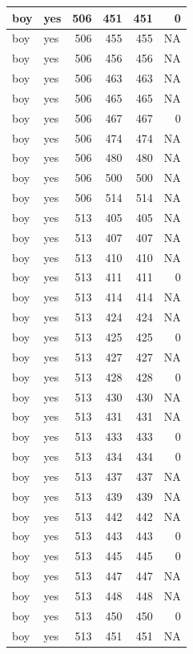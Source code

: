 \documentclass[man]{apa6}
\begin{document}
\begin{tabular}{l|l|r|r|r|r}
\hline
boy & yes & 506 & 451 & 451 & 0\\
\hline
boy & yes & 506 & 455 & 455 & NA\\
\hline
boy & yes & 506 & 456 & 456 & NA\\
\hline
boy & yes & 506 & 463 & 463 & NA\\
\hline
boy & yes & 506 & 465 & 465 & NA\\
\hline
boy & yes & 506 & 467 & 467 & 0\\
\hline
boy & yes & 506 & 474 & 474 & NA\\
\hline
boy & yes & 506 & 480 & 480 & NA\\
\hline
boy & yes & 506 & 500 & 500 & NA\\
\hline
boy & yes & 506 & 514 & 514 & NA\\
\hline
boy & yes & 513 & 405 & 405 & NA\\
\hline
boy & yes & 513 & 407 & 407 & NA\\
\hline
boy & yes & 513 & 410 & 410 & NA\\
\hline
boy & yes & 513 & 411 & 411 & 0\\
\hline
boy & yes & 513 & 414 & 414 & NA\\
\hline
boy & yes & 513 & 424 & 424 & NA\\
\hline
boy & yes & 513 & 425 & 425 & 0\\
\hline
boy & yes & 513 & 427 & 427 & NA\\
\hline
boy & yes & 513 & 428 & 428 & 0\\
\hline
boy & yes & 513 & 430 & 430 & NA\\
\hline
boy & yes & 513 & 431 & 431 & NA\\
\hline
boy & yes & 513 & 433 & 433 & 0\\
\hline
boy & yes & 513 & 434 & 434 & 0\\
\hline
boy & yes & 513 & 437 & 437 & NA\\
\hline
boy & yes & 513 & 439 & 439 & NA\\
\hline
boy & yes & 513 & 442 & 442 & NA\\
\hline
boy & yes & 513 & 443 & 443 & 0\\
\hline
boy & yes & 513 & 445 & 445 & 0\\
\hline
boy & yes & 513 & 447 & 447 & NA\\
\hline
boy & yes & 513 & 448 & 448 & NA\\
\hline
boy & yes & 513 & 450 & 450 & 0\\
\hline
boy & yes & 513 & 451 & 451 & NA\\

\end{tabular}
\end{document}
